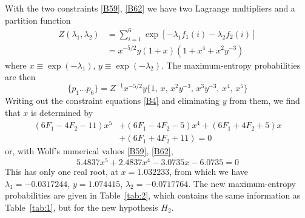 {With the two constraints \eqref{B59}, \eqref{B62} we have two Lagrange multipliers and a partition function
\begin{equation}
	\label{B63}
	\begin{split}
		Z(\lambda_1, \lambda_2)
		&= \sum_{i=1}^{6} \exp[-\lambda_1f_1(i) - \lambda_2f_2(i)]\\
		&= x^{-5/2}  y(1 + x) (1 + x^4 + x^2y^{-3})
	\end{split}
\end{equation}
where $x \equiv \exp (-\lambda_1)$, $y \equiv \exp(-\lambda_2)$.
The maximum-entropy probabilities are then
\begin{equation}
	\label{B64}
	\{p_1\ldots p_6\} = Z^{-1} x^{-5/2}  y\big\{1,\, x,\, x^2 y^{-3},\, x^3y^{-3},\, x^4,\, x^5\big\}
\end{equation}
Writing out the constraint equations \eqref{B4} and eliminating $y$ from them, we find that $x$ is determined by
\begin{equation}
	\label{B65}
	\begin{split}
		(6F_1 - 4F_2 - 11)x^5 &+ (6F_1 - 4F_2 - 5)x^4 + (6F_1 + 4F_2 + 5)x \\
		&+ (6F_1 + 4F_2 + 11) = 0
	\end{split}
\end{equation}
or, with Wolf's numerical values \eqref{B59}, \eqref{B62},
\begin{equation}
	\label{B66}
	5.4837 x^5 + 2.4837 x^4 - 3.0735 x - 6.0735 = 0
\end{equation}
This has only one real root, at $x = 1.032233$, from which we have $\lambda_1 = -0.0317244$, $y = 1.074415$, $\lambda_2 = -0.0717764$.
The new maximum-entropy probabilities are given in Table~\ref{tab:2}, which contains the same information as Table~\ref{tab:1}, but for the new hypothesis $H_2$.

}
